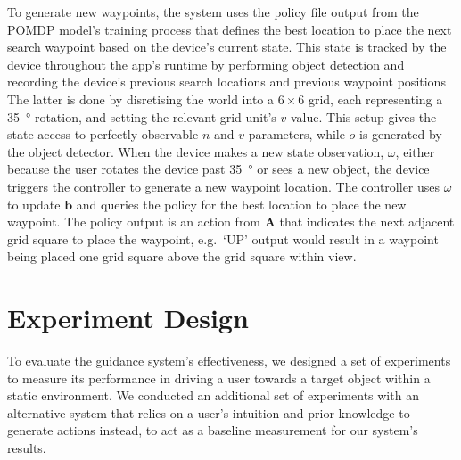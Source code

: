 \documentclass[runningheads]{llncs}
\begin{document}

To generate new waypoints, the system uses the policy file output from the POMDP model's training process that defines the best location to place the next search waypoint based on the device's current state.
This state is tracked by the device throughout the app's runtime by performing object detection and recording the device's previous search locations and previous waypoint positions
The latter is done by disretising the world into a $6\times6$ grid, each representing a \SI{35}{\degree} rotation, and setting the relevant grid unit's $v$ value.
This setup gives the state access to perfectly observable $n$ and $v$ parameters, while $o$ is generated by the object detector. 
When the device makes a new state observation, $\omega$, either because the user rotates the device past \SI{35}{\degree} or sees a new object, the device triggers the controller to generate a new waypoint location.
The controller uses $\omega$ to update $\mathbf{b}$ and queries the policy for the best location to place the new waypoint. 
The policy output is an action from $\mathbf{A}$ that indicates the next adjacent grid square to place the waypoint, e.g.\ `UP' output would result in a waypoint being placed one grid square above the grid square within view. 

\section{Experiment Design}\label{sec:experiments}

To evaluate the guidance system's effectiveness, we designed a set of experiments to measure its performance in driving a user towards a target object within a static environment. 
We conducted an additional set of experiments with an alternative system that relies on a user's intuition and prior knowledge to generate actions instead, to act as a baseline measurement for our system's results. 
\end{document}
